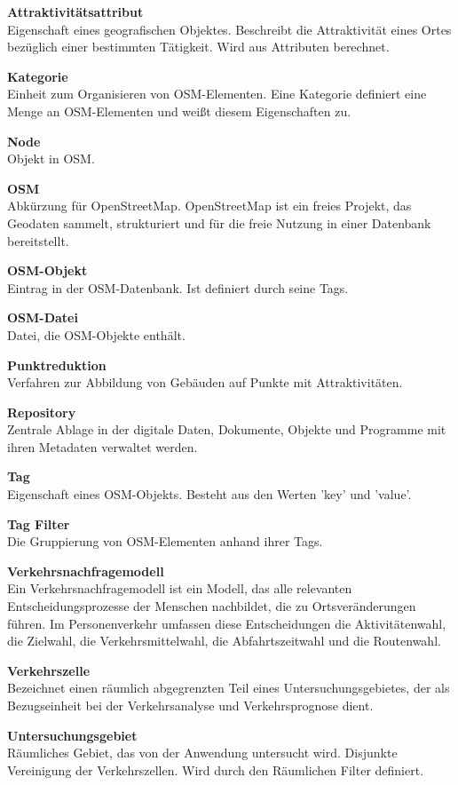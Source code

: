 \documentclass[parskip=full]{scrartcl} %
\begin{document}
\textbf{Attraktivitätsattribut}\\
Eigenschaft eines geografischen Objektes. Beschreibt die Attraktivität eines Ortes bezüglich einer bestimmten Tätigkeit. Wird aus Attributen berechnet.

\textbf{Kategorie}\\
Einheit zum Organisieren von OSM-Elementen. Eine Kategorie definiert eine Menge an OSM-Elementen und weißt diesem Eigenschaften zu.

\textbf{Node}\\
Objekt in OSM.

\textbf{OSM}\\
Abkürzung für OpenStreetMap. OpenStreetMap ist ein freies Projekt, das Geodaten sammelt, strukturiert und für die freie Nutzung in einer Datenbank bereitstellt.

\textbf{OSM-Objekt}\\
Eintrag in der OSM-Datenbank. Ist definiert durch seine Tags.

\textbf{OSM-Datei}\\
Datei, die OSM-Objekte enthält.

\textbf{Punktreduktion}\\
Verfahren zur Abbildung von Gebäuden auf Punkte mit Attraktivitäten.

\textbf{Repository}\\
Zentrale Ablage in der digitale Daten, Dokumente, Objekte und Programme mit ihren Metadaten verwaltet werden.

\textbf{Tag}\\
Eigenschaft eines OSM-Objekts. Besteht aus den Werten 'key' und 'value'.

\textbf{Tag Filter}\\
Die Gruppierung von OSM-Elementen anhand ihrer Tags.

\textbf{Verkehrsnachfragemodell}\\
Ein Verkehrsnachfragemodell ist ein Modell, das alle relevanten Entscheidungsprozesse der Menschen nachbildet, die zu Ortsveränderungen führen. Im Personenverkehr umfassen diese Entscheidungen die Aktivitätenwahl, die Zielwahl, die Verkehrsmittelwahl, die Abfahrtszeitwahl und die Routenwahl.

\textbf{Verkehrszelle}\\
Bezeichnet einen räumlich abgegrenzten Teil eines Untersuchungsgebietes, der als Bezugseinheit bei der Verkehrsanalyse und Verkehrsprognose dient.

\textbf{Untersuchungsgebiet}\\
Räumliches Gebiet, das von der Anwendung untersucht wird. Disjunkte Vereinigung der Verkehrszellen. Wird durch den Räumlichen Filter definiert.
\end{document}
